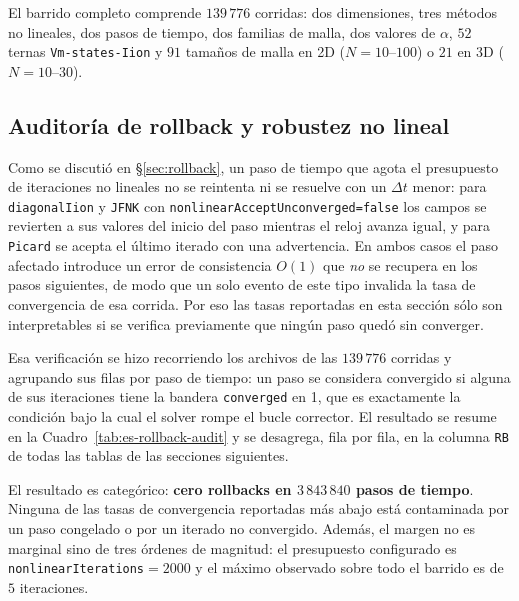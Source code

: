 \documentclass[11pt,a4paper]{article}
\newcommand{\code}[1]{\texttt{\small #1}}
\begin{document}
El barrido completo comprende $139\,776$ corridas: dos dimensiones, tres métodos no lineales,
dos pasos de tiempo, dos familias de malla, dos valores de $\alpha$, $52$ ternas
\code{Vm-states-Iion} y $91$ tamaños de malla en 2D ($N=10$--$100$) o $21$ en 3D
($N=10$--$30$).

\subsection{Auditoría de rollback y robustez no lineal}
\label{sec:es-auditoria-rollback-sec}

Como se discutió en \S\ref{sec:rollback}, un paso de tiempo que agota el presupuesto de
iteraciones no lineales no se reintenta ni se resuelve con un $\Delta t$ menor: para
\code{diagonalIion} y \code{JFNK} con \code{nonlinearAcceptUnconverged=false} los campos se
revierten a sus valores del inicio del paso mientras el reloj avanza igual, y para
\code{Picard} se acepta el último iterado con una advertencia. En ambos casos el paso
afectado introduce un error de consistencia $O(1)$ que \emph{no} se recupera en los pasos
siguientes, de modo que un solo evento de este tipo invalida la tasa de convergencia de esa
corrida. Por eso las tasas reportadas en esta sección sólo son interpretables si se verifica
previamente que ningún paso quedó sin converger.

Esa verificación se hizo recorriendo los archivos
 de las $139\,776$ corridas y
agrupando sus filas por paso de tiempo: un paso se considera convergido si alguna de sus
iteraciones tiene la bandera \code{converged} en 1, que es exactamente la condición bajo la
cual el solver rompe el bucle corrector. El resultado se resume en la
Cuadro~\ref{tab:es-rollback-audit} y se desagrega, fila por fila, en la columna \code{RB}
de todas las tablas de las secciones siguientes.



\FloatBarrier

El resultado es categórico: \textbf{cero rollbacks en $3\,843\,840$ pasos de tiempo}. Ninguna
de las tasas de convergencia reportadas más abajo está contaminada por un paso congelado o
por un iterado no convergido. Además, el margen no es marginal sino de tres órdenes de
magnitud: el presupuesto configurado es \code{nonlinearIterations}$=2000$ y el máximo
observado sobre todo el barrido es de $5$ iteraciones.
\end{document}
